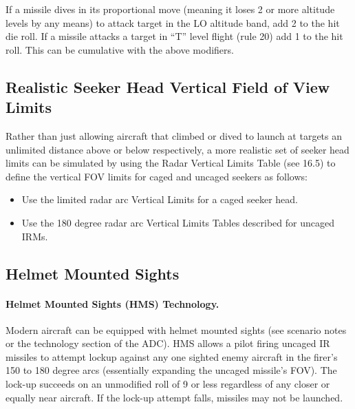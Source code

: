 If a missile dives in its proportional move (meaning it loses 2 or more altitude levels by any means) to attack target in the LO altitude band, add 2 to the hit die roll. If a missile attacks a target in “T” level flight (rule 20) add 1 to the hit roll. This can be cumulative with the above modifiers.


\advancedrules

\subsection{Realistic Seeker Head Vertical Field of View Limits}

Rather than just allowing aircraft that climbed or dived to launch at targets an unlimited distance above or below respectively, a more realistic set of seeker head limits can be simulated by using the Radar Vertical Limits Table (see 16.5) to define the vertical FOV limits for caged and uncaged seekers as follows:

\begin{itemize}

    \item Use the limited radar arc Vertical Limits for a caged seeker head.

    \item Use the 180 degree radar arc Vertical Limits Tables described for uncaged IRMs.

\end{itemize}

\subsection{Helmet Mounted Sights}

\paragraph{Helmet Mounted Sights (HMS) Technology.} Modern aircraft can be equipped with helmet mounted sights (see scenario notes or the technology section of the ADC). HMS allows a pilot firing uncaged IR missiles to attempt lock­up against any one sighted enemy aircraft in the firer's 150 to 180 degree arcs (essentially expanding the uncaged missile's FOV). The lock-up succeeds on an unmodified roll of 9 or less regardless of any closer or equally near aircraft. If the lock-up attempt falls, missiles may not be launched.


